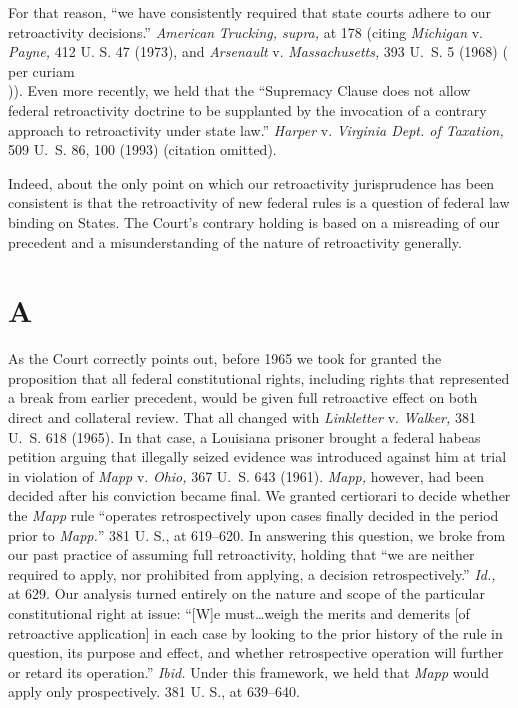 \noindent For that reason, ``we have consistently required that state courts adhere to our retroactivity decisions.'' \emph{American} \newpage \emph{Trucking, supra,} at 178 (citing \emph{Michigan} v. \emph{Payne,} 412 U. S. 47 (1973), and \emph{Arsenault} v. \emph{Massachusetts,} 393 U.~S. 5 (1968) (\\per curiam\\)). Even more recently, we held that the ``Supremacy Clause does not allow federal retroactivity doctrine to be supplanted by the invocation of a contrary approach to retroactivity under state law.'' \emph{Harper} v. \emph{Virginia Dept. of Taxation,} 509 U.~S. 86, 100 (1993) (citation omitted).

  Indeed, about the only point on which our retroactivity jurisprudence has been consistent is that the retroactivity of new federal rules is a question of federal law binding on States. The Court's contrary holding is based on a misreading of our precedent and a misunderstanding of the nature of retroactivity generally.

\section{A}

  As the Court correctly points out, before 1965 we took for granted the proposition that all federal constitutional rights, including rights that represented a break from earlier precedent, would be given full retroactive effect on both direct and collateral review. That all changed with \emph{Linkletter} v. \emph{Walker,} 381 U.~S. 618 (1965). In that case, a Louisiana prisoner brought a federal habeas petition arguing that illegally seized evidence was introduced against him at trial in violation of \emph{Mapp} v. \emph{Ohio,} 367 U.~S. 643 (1961). \emph{Mapp,} however, had been decided after his conviction became final. We granted certiorari to decide whether the \emph{Mapp} rule ``operates retrospectively upon cases finally decided in the period prior to \emph{Mapp.}'' 381 U. S., at 619--620. In answering this question, we broke from our past practice of assuming full retroactivity, holding that ``we are neither required to apply, nor prohibited from applying, a decision retrospectively.'' \emph{Id.,} at 629. Our analysis turned entirely on the nature and scope of the particular constitutional right at issue: ``[W]e must\dots weigh the merits and demerits [of retroactive application] in each case by looking to the prior history of the rule in question, its purpose and effect, and whether retrospective operation will further or retard its operation.'' \emph{Ibid.} \newpage  Under this framework, we held that \emph{Mapp} would apply only prospectively. 381 U. S., at 639--640.

